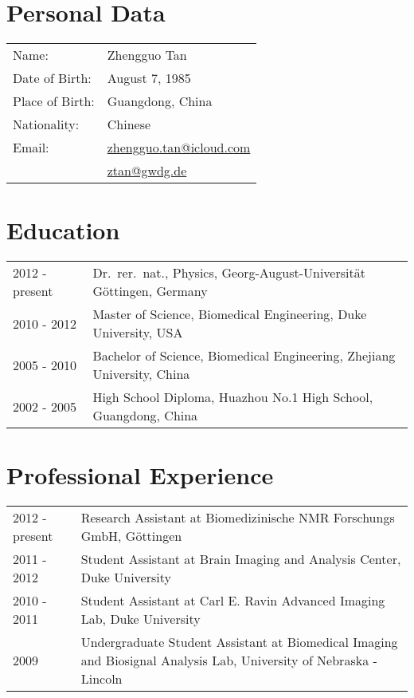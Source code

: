 
\section*{Personal Data}
\begin{tabular}{ p{}p{} }
  Name: & Zhengguo Tan \\
  Date of Birth: & August 7, 1985 \\
  Place of Birth: & Guangdong, China \\
  Nationality: & Chinese \\
  Email: & \href{mailto:zhengguo.tan@icloud.com}{zhengguo.tan@icloud.com} \\
         & \href{mailto:ztan@gwdg.de}{ztan@gwdg.de} \\
\end{tabular}

\section*{Education}
\begin{tabular}{ p{}p{} }
  2012 - present & Dr.~rer.~nat., Physics, Georg-August-Universit\"{a}t G\"{o}ttingen, Germany \\
  2010 - 2012    & Master of Science, Biomedical Engineering, Duke University, USA \\
  2005 - 2010    & Bachelor of Science, Biomedical Engineering, Zhejiang University, China \\
  2002 - 2005    & High School Diploma, Huazhou No.1 High School, Guangdong, China \\
\end{tabular}

\section*{Professional Experience}
\begin{tabular}{ p{}p{} }
  2012 - present & Research Assistant at Biomedizinische NMR Forschungs GmbH, G\"{o}ttingen \\
  2011 - 2012    & Student Assistant at Brain Imaging and Analysis Center, Duke University \\
  2010 - 2011    & Student Assistant at Carl E. Ravin Advanced Imaging Lab, Duke University \\
  2009           & Undergraduate Student Assistant at Biomedical Imaging and Biosignal Analysis Lab, University of Nebraska - Lincoln \\
\end{tabular}

